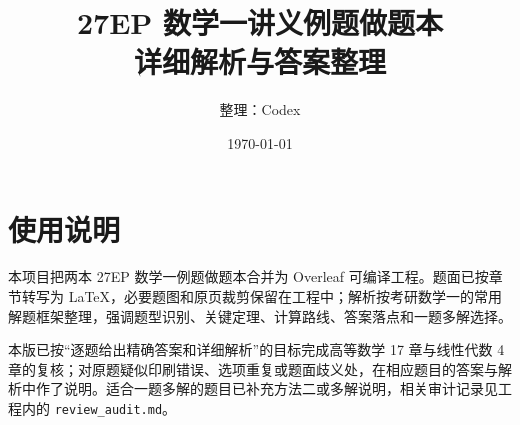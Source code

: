 \documentclass[UTF8,12pt,a4paper]{ctexbook}
\title{27EP 数学一讲义例题做题本\\详细解析与答案整理}
\author{整理：Codex}
\date{\today}
\begin{document}
\maketitle
\tableofcontents

\chapter*{使用说明}
本项目把两本 27EP 数学一例题做题本合并为 Overleaf 可编译工程。题面已按章节转写为 LaTeX，必要题图和原页裁剪保留在工程中；解析按考研数学一的常用解题框架整理，强调题型识别、关键定理、计算路线、答案落点和一题多解选择。

本版已按“逐题给出精确答案和详细解析”的目标完成高等数学 17 章与线性代数 4 章的复核；对原题疑似印刷错误、选项重复或题面歧义处，在相应题目的答案与解析中作了说明。适合一题多解的题目已补充方法二或多解说明，相关审计记录见工程内的 \texttt{review\_audit.md}。






















\end{document}
